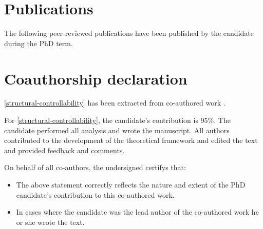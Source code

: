 \vfill

\endgroup

\vfill

%
\chapter*{Publications}%
%
\noindent The following peer-reviewed publications have been published by the candidate during the PhD term.
%
\begin{refsection}
    \nocite{*} %
    \printbibliography[heading=none,keyword=own]
\end{refsection}
%

\chapter*{Coauthorship declaration}
\thispagestyle{empty}
\begin{refsection}
\autoref{structural-controllability} has been extracted from co-authored work \autocites{cagua_keystoneness_2019}.

\printbibliography[heading=none]

For \autoref{structural-controllability}, the candidate's contribution is 95\%. The candidate performed all analysis and wrote the manuscript. All authors contributed to the development of the theoretical framework and edited the text and provided feedback and comments.

\end{refsection}

On behalf of all co-authors, the undersigned certifys that:

\begin{itemize}
	\item The above statement correctly reflects the nature and extent of the PhD candidate's
    contribution to this co-authored work.
	\item In cases where the candidate was the lead author of the co-authored work he or she
    wrote the text.
\end{itemize}

